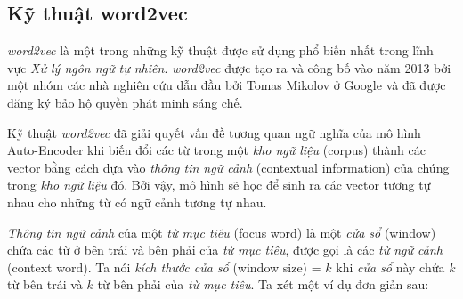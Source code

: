 \subsection{Kỹ thuật word2vec}
\textit{word2vec} là một trong những kỹ thuật được sử dụng phổ biến nhất trong lĩnh vực \textit{Xử lý ngôn ngữ tự nhiên}. \textit{word2vec} được tạo ra và công bố vào năm 2013 bởi một nhóm các nhà nghiên cứu dẫn đầu bởi Tomas Mikolov ở Google và đã được đăng ký bảo hộ quyền phát minh sáng chế.

Kỹ thuật \textit{word2vec} đã giải quyết vấn đề tương quan ngữ nghĩa của mô hình Auto-Encoder khi biến đổi các từ trong một \textit{kho ngữ liệu} (corpus) thành các vector bằng cách dựa vào \textit{thông tin ngữ cảnh} (contextual information) của chúng trong \textit{kho ngữ liệu} đó. Bởi vậy, mô hình sẽ học để sinh ra các vector tương tự nhau cho những từ có ngữ cảnh tương tự nhau.

\textit{Thông tin ngữ cảnh} của một \textit{từ mục tiêu} (focus word) là một \textit{cửa sổ} (window) chứa các từ ở bên trái và bên phải của \textit{từ mục tiêu}, được gọi là các \textit{từ ngữ cảnh} (context word). Ta nói \textit{kích thước cửa sổ} (window size) = $k$ khi \textit{cửa sổ} này chứa $k$ từ bên trái và $k$ từ bên phải của \textit{từ mục tiêu}. Ta xét một ví dụ đơn giản sau:

